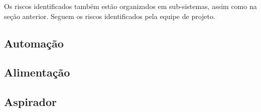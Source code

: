 Os riscos identificados também estão organizados em sub-sistemas, assim como na seção anterior. Seguem os riscos identificados pela equipe de projeto.

\subsection{Automação} %
\label{sub:automação}


\subsection{Alimentação} %
\label{sub:alimentação}


\subsection{Aspirador} %
\label{sub:aspirador}

